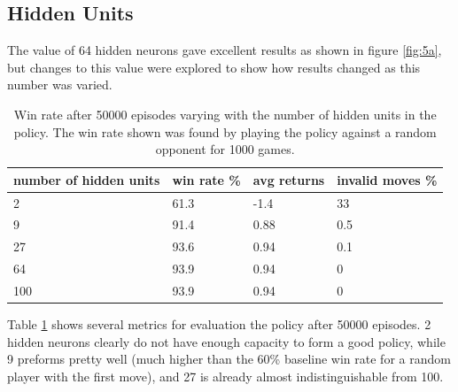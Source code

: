 \documentclass{article}
\renewcommand{\arraystretch}{1.25}
\begin{document}
   \subsection{Hidden Units}
   The value of 64 hidden neurons gave excellent results as shown in figure \ref{fig:5a}, but changes to this value
   were explored to show how results changed as this number was varied.
      \begin{table}[h]
         \centering
         \renewcommand{\arraystretch}{1.5}

         \begin{tabular}{ p{7em}|l|l|l }
            \hline
            number of hidden units     &     win rate \% & avg returns & invalid moves \%   \\
            \hline \hline
            2     &  61.3   & -1.4   &  33    \\
            9     &  91.4   & 0.88   &  0.5   \\
            27    &  93.6   & 0.94   &  0.1   \\
            64    &  93.9   & 0.94   &  0     \\
            100   &  93.9   & 0.94   &  0     \\
            \hline
         \end{tabular}

         \caption{ Win rate after 50000 episodes varying with the number of hidden units in the policy. The win rate
                  shown was found by playing the policy against a random opponent for 1000 games. }
         \label{table:part5b}
      \end{table}
   Table \ref{table:part5b} shows several metrics for evaluation the policy after 50000 episodes. 2 hidden neurons
   clearly do not have enough capacity to form a good policy, while 9 preforms pretty well (much higher than the
   60\% baseline win rate for a random player with the first move), and 27 is already almost indistinguishable from 100.
\end{document}
